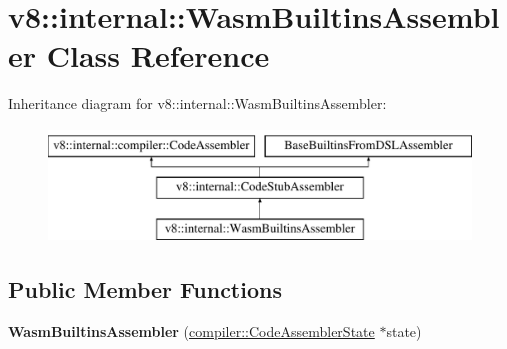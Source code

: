 \hypertarget{classv8_1_1internal_1_1WasmBuiltinsAssembler}{}\section{v8\+:\+:internal\+:\+:Wasm\+Builtins\+Assembler Class Reference}
\label{classv8_1_1internal_1_1WasmBuiltinsAssembler}
Inheritance diagram for v8\+:\+:internal\+:\+:Wasm\+Builtins\+Assembler\+:\begin{figure}[H]
\begin{center}
\leavevmode
\includegraphics[height=3.000000cm]{classv8_1_1internal_1_1WasmBuiltinsAssembler}
\end{center}
\end{figure}
\subsection*{Public Member Functions}
\begin{DoxyCompactItemize}
\item 
\mbox{\label{classv8_1_1internal_1_1WasmBuiltinsAssembler_af07a514d9fdf625cc0d6c470983df2df}} 
{\bfseries Wasm\+Builtins\+Assembler} (\mbox{\hyperlink{classv8_1_1internal_1_1compiler_1_1CodeAssemblerState}{compiler\+::\+Code\+Assembler\+State}} $\ast$state)
\end{DoxyCompactItemize}
